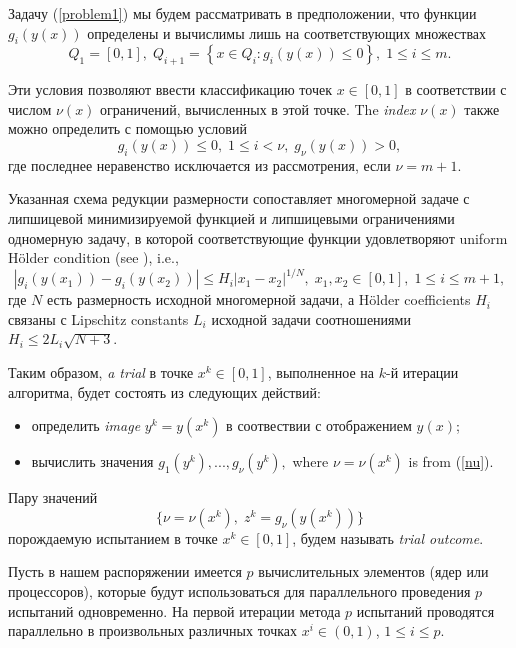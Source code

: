 \documentclass[
11pt,%
tightenlines,%
twoside,%
onecolumn,%
nofloats,%
nobibnotes,%
nofootinbib,%
superscriptaddress,%
noshowpacs,%
centertags]%
{revtex4}
\begin{document}
Задачу (\ref{problem1}) мы будем рассматривать в предположении, что функции $g_i(y(x))$ определены и вычислимы лишь на соответствующих множествах 
\[
Q_1=[0,1], \; Q_{i+1}=\left\{x \in Q_i : g_i(y(x)) \leq 0 \right\}, \; 1 \leq i \leq m.
\]

Эти условия позволяют ввести классификацию точек $x \in [0,1]$ в соответствии с числом $\nu (x)$ ограничений, вычисленных в этой точке. The \textit{index} $\nu(x)$ также можно определить с помощью условий
\begin{equation}\label{nu}
g_i(y(x)) \leq 0, \; 1 \leq i < \nu, \; g_\nu(y(x))>0,
\end{equation}
где последнее неравенство исключается из рассмотрения, если $\nu=m+1$.

Указанная схема редукции размерности сопоставляет многомерной задаче с липшицевой минимизируемой функцией и липшицевыми ограничениями одномерную задачу, в которой соответствующие функции удовлетворяют uniform H{\"o}lder condition (see \cite{Strongin2013}), i.e.,
\[
\left|g_i(y(x_1))-g_i (y(x_2))\right| \leq H_i \left|x_1-x_2 \right|^{1/N}, \; x_1,x_2\in [0,1], \; 
1\leq i \leq m+1,
\]
где $N$ есть размерность исходной многомерной задачи, а H{\"o}lder coefficients $H_i$ связаны с Lipschitz constants $L_i$ исходной задачи соотношениями $H_i \leq 2L_i \sqrt{N+3}$.

Таким образом, \textit{a trial} в точке $x^k \in [0,1]$, выполненное на $k$-й итерации алгоритма, будет состоять из следующих действий:
\begin{itemize}
	\item определить \textit{image} $y^k=y(x^k)$ в соотвествии с отображением $y(x)$;
	\item вычислить значения $g_1(y^k),..., g_\nu(y^k),$ where $\nu = \nu(x^k)$ is from (\ref{nu}). 
\end{itemize}
Пару значений 
\begin{equation} \label{trial_result}
 \{ \nu=\nu(x^k), \; z^k=g_\nu(y(x^k)) \} 
\end{equation}
порождаемую испытанием в точке $x^k \in [0,1]$, будем называть \textit{trial outcome}.

Пусть в нашем распоряжении имеется $p$ вычислительных элементов (ядер или процессоров), которые будут использоваться для параллельного проведения $p$ испытаний одновременно. На первой итерации метода $p$ испытаний проводятся параллельно в произвольных различных точках $x^i\in(0,1)$, $1\leq i \leq p$.
\end{document}
